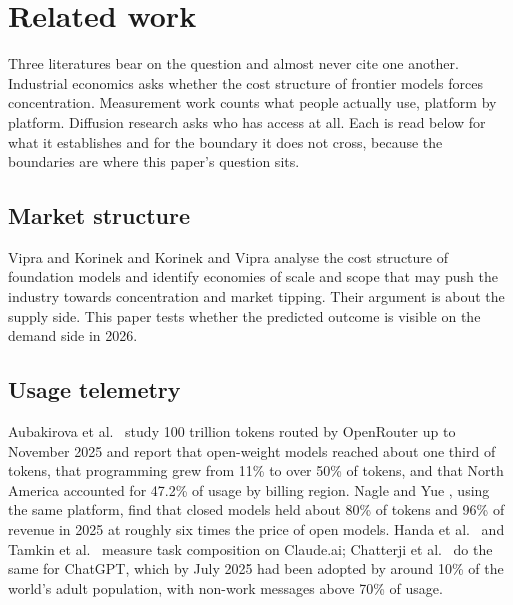 \documentclass[11pt]{article}
\begin{document}
\section{Related work}

Three literatures bear on the question and almost never cite one another. Industrial economics asks whether the cost structure of frontier models forces concentration. Measurement work counts what people actually use, platform by platform. Diffusion research asks who has access at all. Each is read below for what it establishes and for the boundary it does not cross, because the boundaries are where this paper's question sits.

\subsection{Market structure} Vipra and Korinek \cite{vipra2023market} and Korinek and Vipra \cite{korinek2025concentrating} analyse the cost structure of foundation models and identify economies of scale and scope that may push the industry towards concentration and market tipping. Their argument is about the supply side. This paper tests whether the predicted outcome is visible on the demand side in 2026.

\subsection{Usage telemetry} Aubakirova et al.\ \cite{aubakirova2026state} study 100 trillion tokens routed by OpenRouter up to November 2025 and report that open-weight models reached about one third of tokens, that programming grew from 11\% to over 50\% of tokens, and that North America accounted for 47.2\% of usage by billing region. Nagle and Yue \cite{nagle2025latent}, using the same platform, find that closed models held about 80\% of tokens and 96\% of revenue in 2025 at roughly six times the price of open models. Handa et al.\ \cite{handa2025which} and Tamkin et al.\ \cite{tamkin2024clio} measure task composition on Claude.ai; Chatterji et al.\ \cite{chatterji2025how} do the same for ChatGPT, which by July 2025 had been adopted by around 10\% of the world's adult population, with non-work messages above 70\% of usage.
\end{document}
